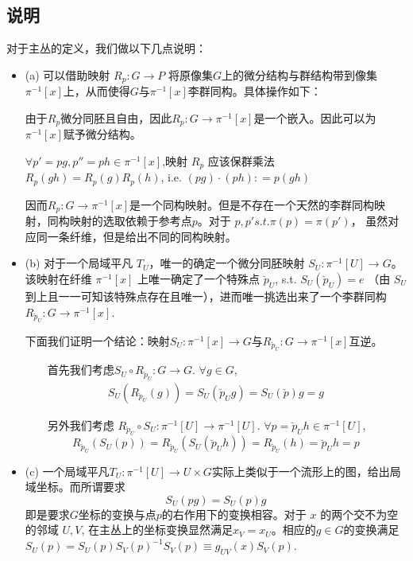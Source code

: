 \documentclass{ctexbook}
\begin{document}
\subsection{说明}
对于主丛的定义，我们做以下几点说明： 

\begin{itemize}
    \item (a) 可以借助映射 $R_{p}\colon G\to P$ 将原像集$G$上的微分结构与群结构带到像集$\pi^{-1}[x]$上，从而使得$G$与$\pi^{-1}[x]$李群同构。具体操作如下：
    
    由于$R_{p}$微分同胚且自由，因此$R_{p}\colon G\rightarrow\pi^{-1}[x]$是一个嵌入。因此可以为$\pi^{-1}[x]$赋予微分结构。
    
    $\forall p'=pg,p''=ph\in\pi^{-1}[x]$,映射 $R_{p}$ 应该保群乘法 $R_{p}(gh)=R_{p}(g)R_{p}(h)$, i.e. $(pg)\cdot(ph)\colon =p(gh)$
    
    因而$R_{p}\colon G\rightarrow\pi^{-1}[x]$是一个同构映射。但是不存在一个天然的李群同构映射，同构映射的选取依赖于参考点$p$。对于 $p,p' s.t.\pi(p)=\pi(p')$， 虽然对应同一条纤维，但是给出不同的同构映射。
    \item (b) 对于一个局域平凡 $T_{U}$，唯一的确定一个微分同胚映射 $S_{U}\colon \pi^{-1}[U]\to G$。该映射在纤维 $\pi^{-1}[x]$ 上唯一确定了一个特殊点 $\breve{p}_{U}$, s.t. $S_{U}(\breve{p}_{U})=e$ （由 $S_{U}$ 到上且一一可知该特殊点存在且唯一），进而唯一挑选出来了一个李群同构$R_{\breve{p}_{U}}\colon G\to \pi^{-1}[x]$.
    
    下面我们证明一个结论：映射$S_{U}\colon \pi^{-1}[x]\to G$与$R_{\breve{p}_{U}}\colon G\rightarrow\pi^{-1}[x]$互逆。
    
    $\qquad$首先我们考虑$S_{U}\circ R_{\breve{p}_{U}}\colon G\to G$. $\forall g\in G$,
    \begin{equation}
        \begin{split}
            S_{U}(R_{\breve{p}_{U}}(g))=S_{U}(\breve{p}_{U}g)=S_{U}(\breve{p})g=g
        \end{split}
    \end{equation}
    
    $\qquad$另外我们考虑 $R_{\breve{p}_{U}}\circ S_{U}\colon  \pi^{-1}[U]\rightarrow\pi^{-1}[U]$. $\forall p=\breve{p}_{U}h\in\pi^{-1}[U]$,
    \begin{equation}
        R_{\breve{p}_{U}}(S_U(p))=R_{\breve{p}_{U}}(S_U(\breve{p}_{U}h))=R_{\breve{p}_{U}}(h)=\breve{p}_{U}h=p
    \end{equation}
    
    \item (c) 一个局域平凡$T_{U}\colon \pi^{-1}[U]\to U\times G$实际上类似于一个流形上的图，给出局域坐标。而所谓要求\[S_U(pg)=S_U(p)g\]即是要求$G$坐标的变换与点$p$的右作用下的变换相容。对于 $x$ 的两个交不为空的邻域 $U,V$, 在主丛上的坐标变换显然满足$x_V=x_U$。相应的$g\in G$的变换满足 $S_{U}(p)=S_{U}(p)S_{V}(p)^{-1}S_{V}(p)\equiv g_{UV}(x)S_{V}(p)$.
    

\end{itemize}
\end{document}
